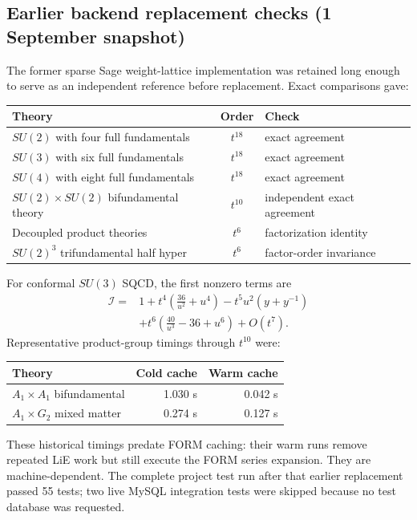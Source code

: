 \documentclass[11pt,a4paper]{article}
\begin{document}
\subsection{Earlier backend replacement checks (1 September snapshot)}
The former sparse Sage weight-lattice implementation was retained long enough to
serve as an independent reference before replacement. Exact comparisons gave:
\begin{tabularx}{\textwidth}{@{}Ycl@{}}
\toprule Theory & Order & Check\\\midrule
$SU(2)$ with four full fundamentals & $t^{18}$ & exact agreement\\
$SU(3)$ with six full fundamentals & $t^{18}$ & exact agreement\\
$SU(4)$ with eight full fundamentals & $t^{18}$ & exact agreement\\
$SU(2)\times SU(2)$ bifundamental theory & $t^{10}$ & independent exact agreement\\
Decoupled product theories & $t^6$ & factorization identity\\
$SU(2)^3$ trifundamental half hyper & $t^6$ & factor-order invariance\\\bottomrule
\end{tabularx}
For conformal $SU(3)$ SQCD, the first nonzero terms are
\begin{equation}
\begin{split}
\mathcal I={}&1+t^4\left(\frac{36}{u^2}+u^4\right)-t^5u^2(y+y^{-1})\\
 &+t^6\left(\frac{40}{u^3}-36+u^6\right)+O(t^7).
\end{split}
\end{equation}
Representative product-group timings through $t^{10}$ were:
\begin{center}\begin{tabular}{lrr}
\toprule Theory & Cold cache & Warm cache\\\midrule
$A_1\times A_1$ bifundamental & 1.030 s & 0.042 s\\
$A_1\times G_2$ mixed matter & 0.274 s & 0.127 s\\\bottomrule
\end{tabular}\end{center}
These historical timings predate FORM caching: their warm runs remove repeated
LiE work but still execute the FORM series expansion. They are machine-dependent.
The complete project test run after that earlier replacement passed 55 tests;
two live MySQL integration tests were skipped because no test database was requested.
\end{document}
